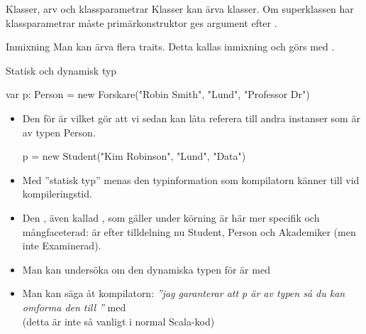 \begin{Slide}{Klasser, arv och klassparametrar}\SlideFontTiny
Klasser kan ärva klasser. Om superklassen har klassparametrar måste primärkonstruktor ges argument efter .


\end{Slide}


\begin{Slide}{Inmixning}\SlideFontTiny
Man kan ärva flera traits. Detta kallas inmixning  och görs med .
\end{Slide}


\begin{Slide}{Statisk och dynamisk typ}\SlideFontSmall
\begin{Code}
    var p: Person = new Forskare("Robin Smith", "Lund", "Professor Dr")
\end{Code}
\begin{itemize}
\item Den  för  är  vilket gör att vi sedan kan låta  referera till andra instanser som är av typen Person.
\begin{Code}
p = new Student("Kim Robinson", "Lund", "Data")
\end{Code}

\pause

\item Med ''statisk typ'' menas den typinformation som kompilatorn känner till vid kompileringstid.

\pause
\item Den , även kallad , som gäller under körning är här mer specifik och mångfaceterad:  är efter tilldelning nu Student, Person och Akademiker (men inte Examinerad). 

\pause

\item Man kan undersöka om den dynamiska typen för  är  med  

\pause

\item Man kan säga åt kompilatorn: \emph{''jag garanterar att p är av typen  så du kan omforma den till ''} med   \\ \pause (detta är inte så vanligt i normal Scala-kod) 
\end{itemize}
\end{Slide}


